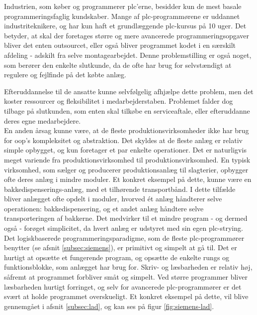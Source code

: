 \noindent Industrien, som køber og programmerer \gls{plc}'erne, besidder kun de mest basale programmeringsfaglig kundskaber. Mange af \gls{plc}-programmørene er uddannet industriteknikere, og har kun haft et grundlæggende \gls{plc}-kursus på 10 uger. Det betyder, at skal der foretages større og mere avancerede programmeringsopgaver bliver det enten outsourcet, eller også bliver programmet kodet i en særskilt afdeling - adskilt fra selve montagearbejdet. Denne problemstilling er også noget, som berører den enkelte slutkunde, da de ofte har brug for selvstændigt at regulere og fejlfinde på det købte anlæg.

\noindent Efteruddannelse til de ansatte kunne selvfølgelig afhjælpe dette problem, men det koster ressourcer og fleksibilitet i medarbejderstaben. Problemet falder dog tilbage på slutkunden, som enten skal tilkøbe en serviceaftale, eller efteruddanne deres egne medarbejdere. \\

\noindent En anden årsag kunne være, at de fleste produktionsvirksomheder ikke har brug for \gls{oop}'s kompleksitet og abstraktion. Det skyldes at de fleste anlæg er relativ simple opbygget, og kun foretager et par enkelte operationer. Det er naturligvis meget variende fra produktionsvirksomhed til produktionsvirksomhed. En typisk virksomhed, som sælger og producerer produktionsanlæg til slagterier, opbygger ofte deres anlæg i mindre moduler. Et konkret eksempel på dette, kunne være en bakkedispenserings-anlæg, med et tilhørende transportbånd. I dette tilfælde bliver anlægget ofte opdelt i moduler, hvorved ét anlæg håndterer selve operationen: bakkedispensering, og et andet anlæg håndtere selve transporteringen af bakkerne. Det medvirker til et mindre program - og dermed også - forøget simplicitet, da hvert anlæg er udstyret med sin egen \gls{plc}-strying. \\

\noindent Det logiskbaserede programmeringsparadigme, som de fleste \gls{plc}-programmører benytter (se afsnit \ref{subsec:siemens}), er primitivt og simpelt at gå til. Det er hurtigt at opsætte et fungerende program, og opsætte de enkelte rungs og funktionsblokke, som anlægget har brug for. Skriv- og læsbarheden er relativ høj, såfremt at programmet forbliver småt og simpelt. Ved større programmer bliver læsbarheden hurtigt forringet, og selv for avancerede \gls{plc}-programmører er det svært at holde programmet overskueligt. Et konkret eksempel på dette, vil blive gennemgået i afsnit \ref{subsec:lad}, og kan ses på figur \ref{fig:siemens-lad}. 

